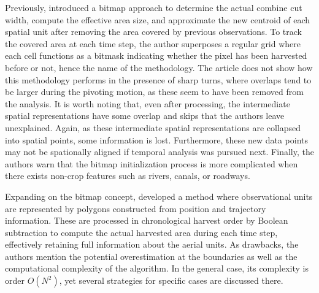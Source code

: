 Previously, \cite{Han1997} introduced a bitmap approach to determine
the actual combine cut width, compute the effective area size, and
approximate the new centroid of each spatial unit after removing the
area covered by previous observations. To track the covered area at
each time step, the author superposes a regular grid where each cell
functions as a bitmask indicating whether the pixel has been harvested
before or not, hence the name of the methodology. The article does not
show how this methodology performs in the presence of sharp turns,
where overlaps tend to be larger during the pivoting motion, as these
seem to have been removed from the analysis. It is worth noting that,
even after processing, the intermediate spatial representations have
some overlap and skips that the authors leave unexplained. Again, as
these intermediate spatial representations are collapsed into spatial
points, some information is lost. Furthermore, these new data points
may not be spationally aligned if temporal analysis was pursued
next. Finally, the authors warn that the bitmap initialization process
is more complicated when there exists non-crop features such as
rivers, canals, or roadways.

Expanding on the bitmap concept, \cite{Drummond1999} developed a
method where observational units are represented by polygons
constructed from position and trajectory information. These are
processed in chronological harvest order by Boolean subtraction to
compute the actual harvested area during each time step, effectively
retaining full information about the aerial units. As drawbacks, the
authors mention the potential overestimation at the boundaries as well
as the computational complexity of the algorithm. In the general case,
its complexity is order $O(N^2)$, yet several strategies for specific
cases are discussed there.

